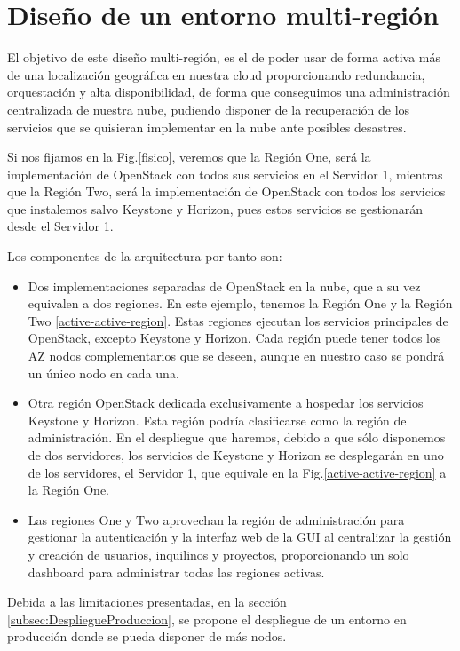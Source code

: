 \section{Diseño de un entorno multi-región}

El objetivo de este diseño multi-región, es el de poder usar de forma activa más de una localización geográfica en nuestra cloud proporcionando redundancia, orquestación  y alta disponibilidad, de forma que conseguimos una administración centralizada de nuestra nube, pudiendo disponer de la recuperación de los servicios que se quisieran implementar en la nube ante posibles desastres. 

Si nos fijamos en la Fig.\ref{fisico}, veremos que la Región One, será la implementación de OpenStack con todos sus servicios en el Servidor 1, mientras que la Región Two, será la implementación de OpenStack con todos los servicios que instalemos salvo Keystone y Horizon, pues estos servicios se gestionarán desde el Servidor 1.

Los componentes de la arquitectura por tanto son:

\begin{itemize}
\item Dos implementaciones separadas de OpenStack en la nube, que a su vez equivalen a dos regiones. En este ejemplo, tenemos la Región One y la Región Two \ref{active-active-region}. Estas regiones ejecutan los servicios principales de OpenStack, excepto Keystone y Horizon. Cada región puede tener todos los AZ nodos complementarios que se deseen, aunque en nuestro caso se pondrá un único nodo en cada una.
\item Otra región OpenStack dedicada exclusivamente a hospedar los servicios Keystone y Horizon. Esta región podría clasificarse como la región de administración. En el despliegue que haremos, debido a que sólo disponemos de dos servidores, los servicios de Keystone y Horizon se desplegarán en uno de los servidores, el Servidor 1, que equivale en la Fig.\ref{active-active-region} a la Región One.
\item Las regiones One y Two aprovechan la región de administración para gestionar la autenticación y la interfaz web de la GUI al centralizar la gestión y creación de usuarios, inquilinos y proyectos, proporcionando un solo dashboard para administrar todas las regiones activas.
\end{itemize}


Debida a las limitaciones presentadas, en la sección \ref{subsec:DespliegueProduccion}, se propone el despliegue de un entorno en producción donde se pueda disponer de más nodos.

